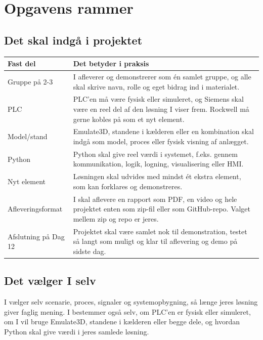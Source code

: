 \documentclass[12pt, a4paper]{article}
\begin{document}
\section{Opgavens rammer}

\subsection{Det skal indgå i projektet}

\begin{center}
\begin{tabularx}{\textwidth}{>{\raggedright\arraybackslash}p{} X}
\toprule
\textbf{Fast del} & \textbf{Det betyder i praksis} \\
\midrule
Gruppe på 2-3 & I afleverer og demonstrerer som én samlet gruppe, og alle skal skrive navn, rolle og eget bidrag ind i materialet. \\[6pt]
PLC & PLC'en må være fysisk eller simuleret, og Siemens skal være en reel del af den løsning I viser frem. Rockwell må gerne kobles på som et nyt element. \\[6pt]
Model/stand & Emulate3D, standene i kælderen eller en kombination skal indgå som model, proces eller fysisk visning af anlægget. \\[6pt]
Python & Python skal give reel værdi i systemet, f.eks. gennem kommunikation, logik, logning, visualisering eller HMI. \\[6pt]
Nyt element & Løsningen skal udvides med mindst ét ekstra element, som kan forklares og demonstreres. \\[6pt]
Afleveringsformat & I skal aflevere en rapport som PDF, en video og hele projektet enten som zip-fil eller som GitHub-repo. Valget mellem zip og repo er jeres. \\[6pt]
Afslutning på Dag 12 & Projektet skal være samlet nok til demonstration, testet så langt som muligt og klar til aflevering og demo på sidste dag. \\
\bottomrule
\end{tabularx}
\end{center}

\subsection{Det vælger I selv}

\begin{tcolorbox}[infobox, title={\faInfoCircle\quad Jeres egne valg}]
I vælger selv scenarie, proces, signaler og systemopbygning, så længe jeres
løsning giver faglig mening. I bestemmer også selv, om PLC'en er fysisk eller
simuleret, om I vil bruge Emulate3D, standene i kælderen eller begge dele, og
hvordan Python skal give værdi i jeres samlede løsning.
\end{tcolorbox}
\end{document}
